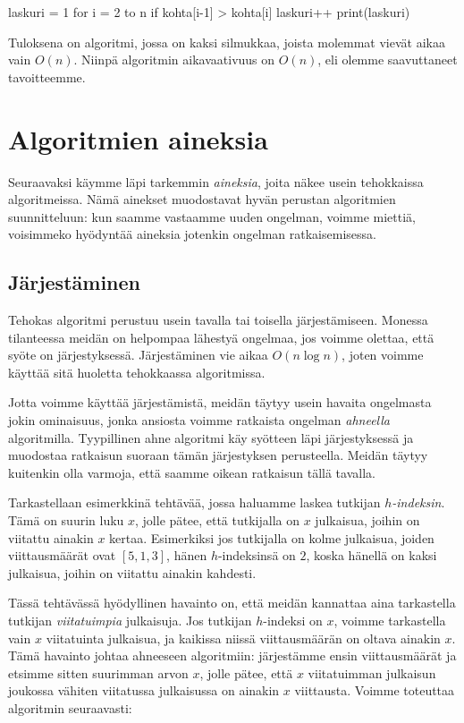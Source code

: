 \begin{code}
laskuri = 1
for i = 2 to n
    if kohta[i-1] > kohta[i]
        laskuri++
print(laskuri)
\end{code}

Tuloksena on algoritmi, jossa on kaksi silmukkaa,
joista molemmat vievät aikaa vain $O(n)$.
Niinpä algoritmin aikavaativuus on $O(n)$,
eli olemme saavuttaneet tavoitteemme.

\section{Algoritmien aineksia}

Seuraavaksi käymme läpi tarkemmin \emph{aineksia},
joita näkee usein tehokkaissa algoritmeissa.
Nämä ainekset muodostavat hyvän perustan algoritmien
suunnitteluun: kun saamme vastaamme uuden ongelman,
voimme miettiä, voisimmeko hyödyntää aineksia jotenkin
ongelman ratkaisemisessa.

\subsection{Järjestäminen}

Tehokas algoritmi perustuu usein tavalla tai toisella järjestämiseen.
Monessa tilanteessa meidän on helpompaa lähestyä ongelmaa,
jos voimme olettaa, että syöte on järjestyksessä.
Järjestäminen vie aikaa $O(n \log n)$, joten voimme käyttää sitä
huoletta tehokkaassa algoritmissa.

Jotta voimme käyttää järjestämistä, meidän täytyy usein havaita
ongelmasta jokin ominaisuus, jonka ansiosta voimme ratkaista
ongelman \emph{ahneella} algoritmilla.
Tyypillinen ahne algoritmi käy syötteen läpi järjestyksessä ja
muodostaa ratkaisun suoraan tämän järjestyksen perusteella.
Meidän täytyy kuitenkin olla varmoja, että saamme oikean ratkaisun tällä tavalla.

Tarkastellaan esimerkkinä tehtävää, jossa haluamme laskea
tutkijan \emph{$h$-indeksin}. Tämä on suurin luku $x$, jolle pätee,
että tutkijalla on $x$ julkaisua, joihin on viitattu ainakin $x$ kertaa.
Esimerkiksi jos tutkijalla on kolme julkaisua,
joiden viittausmäärät ovat $[5,1,3]$, hänen $h$-indeksinsä on $2$,
koska hänellä on kaksi julkaisua, joihin on viitattu ainakin kahdesti.

Tässä tehtävässä hyödyllinen havainto on, että meidän kannattaa aina
tarkastella tutkijan \emph{viitatuimpia} julkaisuja.
Jos tutkijan $h$-indeksi on $x$, voimme tarkastella vain $x$ viitatuinta
julkaisua, ja kaikissa niissä viittausmäärän on oltava ainakin $x$.
Tämä havainto johtaa ahneeseen algoritmiin: järjestämme ensin
viittausmäärät ja etsimme sitten suurimman arvon $x$,
jolle pätee, että $x$ viitatuimman julkaisun joukossa vähiten viitatussa
julkaisussa on ainakin $x$ viittausta. Voimme toteuttaa algoritmin seuraavasti:

